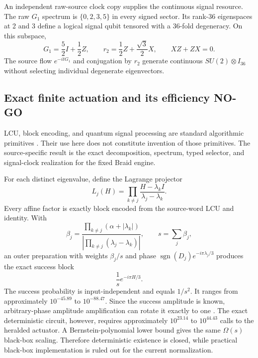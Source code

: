 \documentclass[11pt]{article}
\theoremstyle{definition}
\theoremstyle{remark}
\begin{document}
An independent raw-source clock copy supplies the continuous signal resource. The raw $G_1$ spectrum is $\{0,2,3,5\}$ in every signed sector. Its rank-36 eigenspaces at 2 and 3 define a logical signal qubit tensored with a 36-fold degeneracy. On this subspace,
\begin{equation}
 G_1=\frac52I+\frac12Z,\qquad
 r_2=\frac12Z+\frac{\sqrt3}{2}X,\qquad XZ+ZX=0.
\end{equation}
The source flow $e^{-itG_1}$ and conjugation by $r_2$ generate continuous $SU(2)\otimes I_{36}$ without selecting individual degenerate eigenvectors.

\subsection{Exact finite actuation and its efficiency NO-GO}

LCU, block encoding, and quantum signal processing are standard algorithmic primitives \cite{childswiebe2012,lowchuang2017,gilyen2019}. Their use here does not constitute invention of those primitives. The source-specific result is the exact decomposition, spectrum, typed selector, and signal-clock realization for the fixed Braid engine.

For each distinct eigenvalue, define the Lagrange projector
\begin{equation}
 L_j(H)=\prod_{k\ne j}\frac{H-\lambda_kI}{\lambda_j-\lambda_k}.
\end{equation}
Every affine factor is exactly block encoded from the source-word LCU and identity. With
\begin{equation}
 \beta_j=
 \frac{\prod_{k\ne j}(\alpha+|\lambda_k|)}
 {|\prod_{k\ne j}(\lambda_j-\lambda_k)|},\qquad
 s=\sum_j\beta_j,
\end{equation}
an outer preparation with weights $\beta_j/s$ and phase
$\operatorname{sgn}(D_j)e^{-i\pi\lambda_j/3}$ produces the exact success block
\begin{equation}
 \frac1s e^{-i\pi H/3}.
\end{equation}
The success probability is input-independent and equals $1/s^2$. It ranges from approximately $10^{-45.89}$ to $10^{-88.47}$. Since the success amplitude is known, arbitrary-phase amplitude amplification can rotate it exactly to one \cite{hoyer2000,brassard2002}. The exact deterministic circuit, however, requires approximately $10^{23.14}$ to $10^{44.43}$ calls to the heralded actuator. A Bernstein-polynomial lower bound gives the same $\Omega(s)$ black-box scaling. Therefore deterministic existence is closed, while practical black-box implementation is ruled out for the current normalization.
\end{document}
